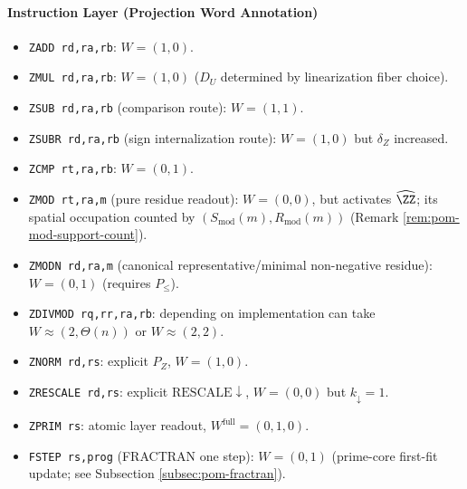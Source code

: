 \paragraph{Instruction Layer (Projection Word Annotation)}
\begin{itemize}
  \item \texttt{ZADD rd,ra,rb}: $W=(1,0)$.
  \item \texttt{ZMUL rd,ra,rb}: $W=(1,0)$ ($D_U$ determined by linearization fiber choice).
  \item \texttt{ZSUB rd,ra,rb} (comparison route): $W=(1,1)$.
  \item \texttt{ZSUBR rd,ra,rb} (sign internalization route): $W=(1,0)$ but $\delta_Z$ increased.
  \item \texttt{ZCMP rt,ra,rb}: $W=(0,1)$.
  \item \texttt{ZMOD rt,ra,m} (pure residue readout): $W=(0,0)$, but activates $\widehat{\ZZ}$; its spatial occupation counted by $(S_{\mathrm{mod}}(m),R_{\mathrm{mod}}(m))$ (Remark \ref{rem:pom-mod-support-count}).
  \item \texttt{ZMODN rd,ra,m} (canonical representative/minimal non-negative residue): $W=(0,1)$ (requires $P_{\le}$).
  \item \texttt{ZDIVMOD rq,rr,ra,rb}: depending on implementation can take $W\approx(2,\Theta(n))$ or $W\approx(2,2)$.
  \item \texttt{ZNORM rd,rs}: explicit $P_Z$, $W=(1,0)$.
  \item \texttt{ZRESCALE rd,rs}: explicit $\mathrm{RESCALE}\downarrow$, $W=(0,0)$ but $k_{\downarrow}=1$.
  \item \texttt{ZPRIM rs}: atomic layer readout, $W^{\mathrm{full}}=(0,1,0)$.
  \item \texttt{FSTEP rs,prog} (FRACTRAN one step): $W=(0,1)$ (prime-core first-fit update; see Subsection \ref{subsec:pom-fractran}).
\end{itemize}

